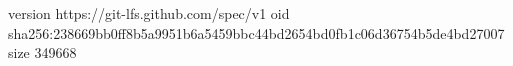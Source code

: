 version https://git-lfs.github.com/spec/v1
oid sha256:238669bb0ff8b5a9951b6a5459bbc44bd2654bd0fb1c06d36754b5de4bd27007
size 349668
